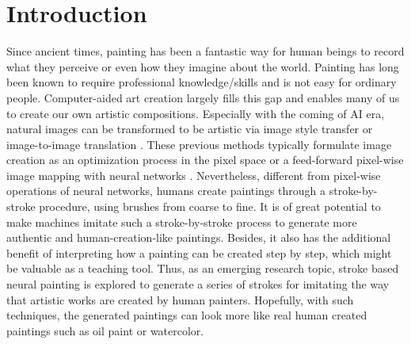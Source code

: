 \documentclass[10pt,twocolumn,letterpaper]{article}
\begin{document}
\section{Introduction}

Since ancient times, painting has been a fantastic way for human beings to record what they perceive or even how they imagine about the world. Painting has long been known to require professional knowledge/skills and is not easy for ordinary people. Computer-aided art creation largely fills this gap and enables many of us to create our own artistic compositions. Especially with the coming of AI era, natural images can be transformed to be artistic via image style transfer \cite{li2018learning, huang2017arbitrary, johnson2016perceptual, park2019arbitrary, kolkin2019style} or image-to-image translation \cite{CycleGAN2017, wang2020learning, chen2018cartoongan, yi2019apdrawinggan, yi2020unpaired}. These previous methods typically formulate image creation as an optimization process in the pixel space \cite{gatys2016image} or a feed-forward pixel-wise image mapping with neural networks \cite{isola2017image,CycleGAN2017}. Nevertheless, different from pixel-wise operations of neural networks, humans create paintings through a stroke-by-stroke procedure, using brushes from coarse to fine. It is of great potential to make machines imitate such a stroke-by-stroke process to generate more authentic and human-creation-like paintings. Besides, it also has the additional benefit of interpreting how a painting can be created step by step, which might be valuable as a teaching tool. 
Thus, as an emerging research topic, stroke based neural painting is explored to generate a series of strokes for imitating the way that artistic works are created by human painters. Hopefully, with such techniques, the generated paintings can look more like real human created paintings such as oil paint or watercolor.
\end{document}
